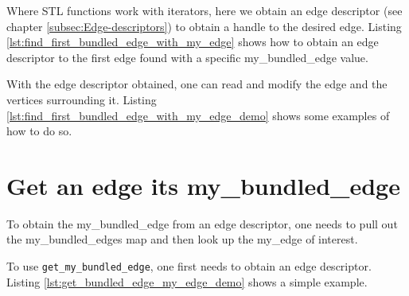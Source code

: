 Where STL functions work with iterators, here we obtain an edge descriptor
(see chapter \ref{subsec:Edge-descriptors}) 
to obtain a handle to the desired edge.
Listing \ref{lst:find_first_bundled_edge_with_my_edge}
shows how to obtain an edge descriptor to the first edge found with a specific
my_bundled_edge value.



With the edge descriptor obtained, one can read and modify the edge and
the vertices surrounding it.
Listing \ref{lst:find_first_bundled_edge_with_my_edge_demo}
shows some examples of how to do so.



\section{Get an edge its my\_bundled\_edge}
\label{subsec:get_bundled_edge_my_edge}

To obtain the my\_bundled\_edge from an edge descriptor, one needs to pull
out the my\_bundled_edges map and then look up the my\_edge of interest.



To use \verb;get_my_bundled_edge;, 
one first needs to obtain an edge descriptor.
Listing \ref{lst:get_bundled_edge_my_edge_demo} shows a simple example.



